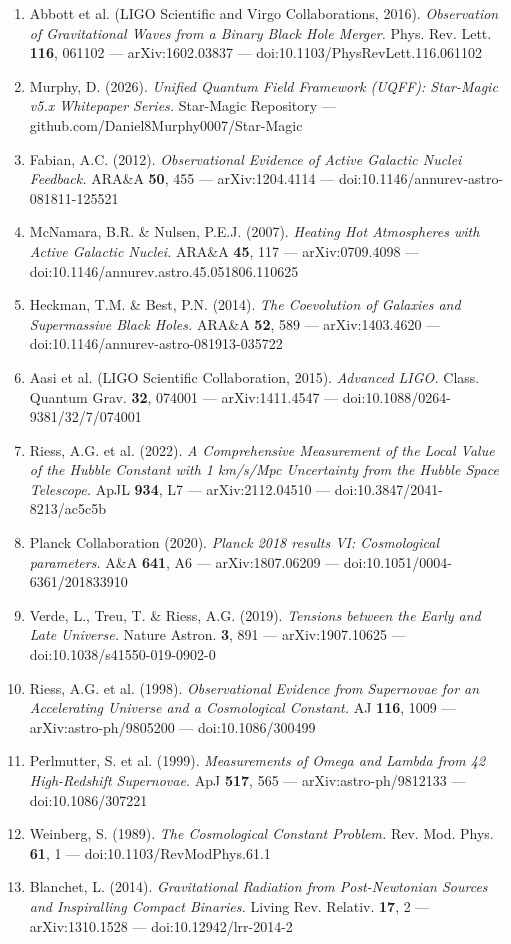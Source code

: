 \documentclass[12pt,a4paper]{article}
\begin{document}
\begin{enumerate}
  \item Abbott et al. (LIGO Scientific and Virgo Collaborations, 2016). \emph{Observation of Gravitational Waves from a Binary Black Hole Merger.} Phys. Rev. Lett. \textbf{116}, 061102 --- arXiv:1602.03837 --- doi:10.1103/PhysRevLett.116.061102
  \item Murphy, D. (2026). \emph{Unified Quantum Field Framework (UQFF): Star-Magic v5.x Whitepaper Series.} Star-Magic Repository --- github.com/Daniel8Murphy0007/Star-Magic
  \item Fabian, A.C. (2012). \emph{Observational Evidence of Active Galactic Nuclei Feedback.} ARA\&A \textbf{50}, 455 --- arXiv:1204.4114 --- doi:10.1146/annurev-astro-081811-125521
  \item McNamara, B.R. \& Nulsen, P.E.J. (2007). \emph{Heating Hot Atmospheres with Active Galactic Nuclei.} ARA\&A \textbf{45}, 117 --- arXiv:0709.4098 --- doi:10.1146/annurev.astro.45.051806.110625
  \item Heckman, T.M. \& Best, P.N. (2014). \emph{The Coevolution of Galaxies and Supermassive Black Holes.} ARA\&A \textbf{52}, 589 --- arXiv:1403.4620 --- doi:10.1146/annurev-astro-081913-035722
  \item Aasi et al. (LIGO Scientific Collaboration, 2015). \emph{Advanced LIGO.} Class. Quantum Grav. \textbf{32}, 074001 --- arXiv:1411.4547 --- doi:10.1088/0264-9381/32/7/074001
  \item Riess, A.G. et al. (2022). \emph{A Comprehensive Measurement of the Local Value of the Hubble Constant with 1 km/s/Mpc Uncertainty from the Hubble Space Telescope.} ApJL \textbf{934}, L7 --- arXiv:2112.04510 --- doi:10.3847/2041-8213/ac5c5b
  \item Planck Collaboration (2020). \emph{Planck 2018 results VI: Cosmological parameters.} A\&A \textbf{641}, A6 --- arXiv:1807.06209 --- doi:10.1051/0004-6361/201833910
  \item Verde, L., Treu, T. \& Riess, A.G. (2019). \emph{Tensions between the Early and Late Universe.} Nature Astron. \textbf{3}, 891 --- arXiv:1907.10625 --- doi:10.1038/s41550-019-0902-0
  \item Riess, A.G. et al. (1998). \emph{Observational Evidence from Supernovae for an Accelerating Universe and a Cosmological Constant.} AJ \textbf{116}, 1009 --- arXiv:astro-ph/9805200 --- doi:10.1086/300499
  \item Perlmutter, S. et al. (1999). \emph{Measurements of Omega and Lambda from 42 High-Redshift Supernovae.} ApJ \textbf{517}, 565 --- arXiv:astro-ph/9812133 --- doi:10.1086/307221
  \item Weinberg, S. (1989). \emph{The Cosmological Constant Problem.} Rev. Mod. Phys. \textbf{61}, 1 --- doi:10.1103/RevModPhys.61.1
  \item Blanchet, L. (2014). \emph{Gravitational Radiation from Post-Newtonian Sources and Inspiralling Compact Binaries.} Living Rev. Relativ. \textbf{17}, 2 --- arXiv:1310.1528 --- doi:10.12942/lrr-2014-2
\end{enumerate}
\end{document}
